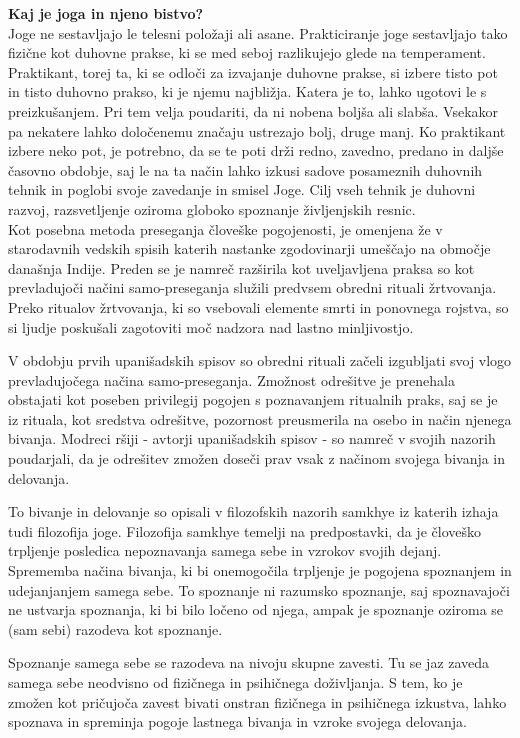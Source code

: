 \documentclass[a4paper, 12pt]{book}
\begin{document}
\textbf{Kaj je joga in njeno bistvo?}\\

Joge ne sestavljajo le telesni položaji ali asane. Prakticiranje joge sestavljajo tako fizične kot duhovne prakse, ki se med seboj razlikujejo glede na temperament. Praktikant, torej ta, ki se odloči za izvajanje duhovne prakse, si izbere tisto pot in tisto duhovno prakso, ki je njemu najbližja. Katera je to, lahko ugotovi le s preizkušanjem. Pri tem velja poudariti, da ni nobena boljša ali slabša. Vsekakor pa nekatere lahko določenemu značaju ustrezajo bolj, druge manj. Ko praktikant izbere neko pot, je potrebno, da se te poti drži redno, zavedno, predano in daljše časovno obdobje, saj le na ta način lahko izkusi sadove posameznih duhovnih tehnik in poglobi svoje zavedanje in smisel Joge. Cilj vseh tehnik je duhovni razvoj, razsvetljenje oziroma globoko spoznanje življenjskih resnic. \\ 

Kot posebna metoda preseganja človeške pogojenosti, je omenjena že v starodavnih vedskih spisih katerih nastanke zgodovinarji umeščajo na območje današnja Indije. Preden se je namreč razširila kot uveljavljena praksa so kot prevladujoči načini samo-preseganja služili predvsem obredni rituali žrtvovanja. Preko ritualov žrtvovanja, ki so vsebovali elemente smrti in ponovnega rojstva, so si ljudje poskušali zagotoviti moč nadzora nad lastno minljivostjo. 

V obdobju prvih upanišadskih spisov so obredni rituali začeli izgubljati svoj vlogo prevladujočega načina samo-preseganja. Zmožnost odrešitve je prenehala obstajati kot poseben privilegij pogojen s poznavanjem ritualnih praks, saj se je iz rituala, kot sredstva odrešitve, pozornost preusmerila na osebo in način njenega bivanja. Modreci ršiji - avtorji upanišadskih spisov - so namreč v svojih nazorih poudarjali, da je odrešitev zmožen doseči prav vsak z načinom svojega bivanja in delovanja.

To bivanje in delovanje so opisali v filozofskih nazorih samkhye iz katerih izhaja tudi filozofija joge. Filozofija samkhye temelji na predpostavki, da je človeško trpljenje posledica nepoznavanja samega sebe in vzrokov svojih dejanj. Sprememba načina bivanja, ki bi onemogočila trpljenje je pogojena spoznanjem in udejanjanjem samega sebe. To spoznanje ni razumsko spoznanje, saj spoznavajoči ne ustvarja spoznanja, ki bi bilo ločeno od njega, ampak je spoznanje oziroma se (sam sebi) razodeva kot spoznanje.

Spoznanje samega sebe se razodeva na nivoju skupne zavesti. Tu se jaz zaveda samega sebe neodvisno od fizičnega in psihičnega doživljanja. S tem, ko je zmožen kot pričujoča zavest bivati onstran fizičnega in psihičnega izkustva, lahko spoznava in spreminja pogoje lastnega bivanja in vzroke svojega delovanja.
\end{document}
